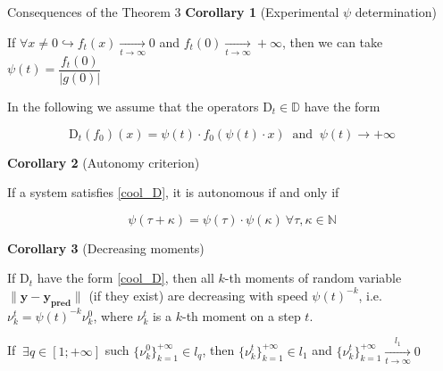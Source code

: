\documentclass[aspectratio=169]{beamer}
\begin{document}
    \begin{frame}{Consequences of the Theorem 3}
        \small
        \textcolor{myNewColorA}{\textbf{Corollary 1} (Experimental $\psi$ determination)}

        If 
            $\forall x \neq 0 \hookrightarrow f_t(x) \underset{t \to \infty}{\longrightarrow} 0$ and $f_t(0) \underset{t \to \infty}{\longrightarrow} +\infty$,
        then we can take
            $\psi(t) = \dfrac{f_t(0)}{|g(0)|}$

        In the following we assume that the operators $\text{D}_t \in \mathbb{D}$ have the form  

        \begin{equation} \label{cool_D}
            \text{D}_t(f_0)(x) = \psi(t) \cdot f_0(\psi(t) \cdot x) ~\text{ and }~ \psi(t) \to +\infty
        \end{equation}
        
        \textcolor{myNewColorA}{\textbf{Corollary 2} (Autonomy criterion)}

        If a system satisfies \eqref{cool_D}, it is autonomous if and only if

        \begin{equation} \label{cong_semigroup}
            \psi(\tau + \kappa) = \psi(\tau) \cdot \psi(\kappa) ~\forall \tau, \kappa \in \mathbb{N}
        \end{equation}

        \textcolor{myNewColorA}{\textbf{Corollary 3} (Decreasing moments)}

        If $\text{D}_t$ have the form \eqref{cool_D}, then all $k$-th moments of random variable $\|\mathbf{y} - \mathbf{y_{\text{pred}}}\|$ (if they exist) are decreasing with speed $\psi(t)^{-k}$, i.e. $\nu_k^t = \psi(t)^{-k} \nu_k^0$, where $\nu_k^t$ is a $k$-th moment on a step $t$.

        If $~\exists q \in [1; +\infty]$ such $\{\nu_k^0\}_{k=1}^{+\infty} \in l_q$, then $\{\nu_k^t\}_{k=1}^{+\infty} \in l_1$ and $\{\nu_k^t\}_{k=1}^{+\infty} \underset{t \to \infty}{\overset{l_1}{\longrightarrow}} 0$

    \end{frame}
\end{document}
